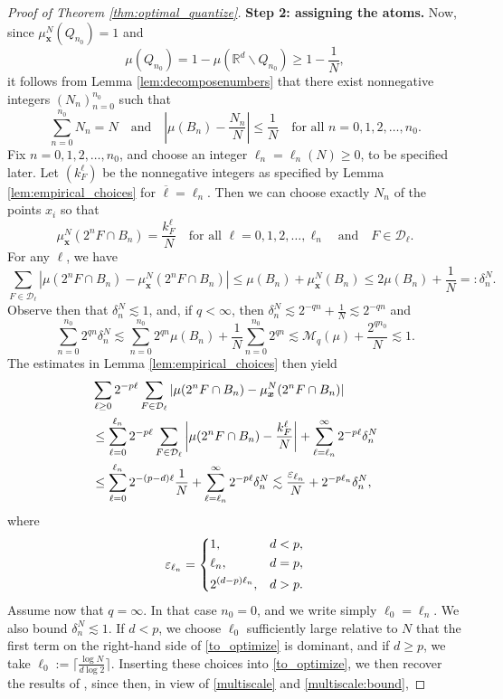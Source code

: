 \documentclass[11pt,reqno]{amsart}
\newcommand{\bx}{{\bm{x}}}
\theoremstyle{definition}
\def\bx{{\boldsymbol x}}
\newcommand{\bm}[1]{\boldsymbol #1}
\newcommand{\RR}{{\mathbb R}}
\newcommand{\eps}{\varepsilon}
\newcommand{\oline}[1]{\overline{#1}}
\newcommand{\mcl}{\mathcal}
\theoremstyle{definition}
\numberwithin{equation}{section}
\numberwithin{lemma}{section}
\numberwithin{proposition}{section}
\numberwithin{theorem}{section}
\numberwithin{corollary}{section}
\numberwithin{definition}{section}
\numberwithin{remark}{section}
\begin{document}
\begin{proof}[Proof of Theorem \ref{thm:optimal_quantize}]
    \textbf{Step 2: assigning the atoms.} Now, since $\mu^N_\bx(Q_{n_0}) = 1$ and
	\[
		\mu(Q_{n_0}) = 1 - \mu(\RR^d \backslash Q_{n_0}) \ge 1 -  \frac{1}{N},
	\]
	it follows from Lemma \ref{lem:decomposenumbers} that there exist nonnegative integers $(N_n)_{n = 0}^{n_0}$ such that
	\[
		\sum_{n=0}^{n_0} N_n = N \quad \text{and} 
		\quad \left| \mu(B_n) - \frac{N_n}{N} \right| 
		\le \frac{1}{N} \quad \text{for all } n = 0,1,2,\ldots, n_0.
	\]
	Fix $n = 0,1,2,\ldots, n_0$, and choose an integer $\ell_n = \ell_n(N) \ge 0$, to be specified later. Let $(k^\ell_F)$ be the nonnegative integers as specified by Lemma \ref{lem:empirical_choices} for $\oline\ell = \ell_n$. Then we can choose exactly $N_n$ of the points $x_i$ so that
\[
	\mu^N_\bx(2^n F \cap B_n) = \frac{k^\ell_F}{N} \quad \text{for all } \ell = 0,1,2,\ldots, \ell_n \quad \text{and} \quad F \in \mcl D_\ell.
\]
For any $\ell$, we have
\[
    \sum_{F \in \mcl D_\ell} |\mu(2^n F \cap B_n) - \mu^N_\bx(2^n F \cap B_n)|
    \le \mu(B_n) + \mu^N_\bx(B_n) \le 2\mu(B_n) + \frac{1}{N} =: \delta_n^N.
\]
Observe then that $\delta_n^N \lesssim 1$, and, if $q < \infty$, then $\delta_n^N  \lesssim 2^{-qn} + \frac{1}{N} \lesssim 2^{-qn}$ and
\begin{equation}\label{moment_sum}
	\sum_{n=0}^{n_0} 2^{qn} \delta_n^N \lesssim \sum_{n=0}^{n_0} 2^{qn} \mu(B_n) + \frac{1}{N} \sum_{n=0}^{n_0} 2^{qn} \lesssim \mcl M_q(\mu) + \frac{2^{qn_0}}{N} \lesssim 1.
\end{equation}
The estimates in Lemma \ref{lem:empirical_choices} then yield
\begin{align}\label{to_optimize}
	&\sum_{\ell \ge 0} 2^{-p\ell} \sum_{F \in \mcl D_\ell} |\mu(2^n F \cap B_n) - \mu^N_\bx(2^n F \cap B_n) \notag |\\
	&\le \sum_{\ell = 0}^{\ell_n} 2^{-p\ell} \sum_{F \in \mcl D_\ell} \left|\mu(2^n F \cap B_n) - \frac{k_F^\ell}{N}\right| +  \sum_{\ell = \ell_n}^{\infty} 2^{-p\ell} \delta_n^N \notag \\
	&\le \sum_{\ell=0}^{\ell_n} 2^{-(p -d)\ell} \frac{1}{N} + \sum_{\ell = \ell_n}^{\infty} 2^{-p\ell} \delta_n^N \lesssim \frac{\eps_{\ell_n}}{N} + 2^{-p\ell_n} \delta_n^N,
\end{align}
where
\[
	\eps_{\ell_n} =
	\begin{dcases}
		1, & d < p, \\
		\ell_n, & d = p, \\
		2^{(d-p)\ell_n}, & d > p.
	\end{dcases}
\]
Assume now that $q = \infty$. In that case $n_0 = 0$, and we write simply $\ell_0 = \ell_n$. We also bound $\delta_n^N \lesssim 1$. If $d < p$, we choose $\ell_0$ sufficiently large relative to $N$ that the first term on the right-hand side of \eqref{to_optimize} is dominant, and if $d \ge p$, we take $\ell_0 := \Bigg\lceil \frac{\log N}{d \log 2} \Bigg\rceil$. Inserting these choices into \eqref{to_optimize}, we then recover the results of \cite[Theorem 3]{Chev}, since then, in view of \eqref{multiscale} and \eqref{multiscale:bound},

\end{proof}
\end{document}
